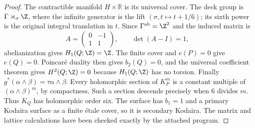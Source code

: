 \begin{proof}
The contractible manifold $H\times\mathbb R$ is its universal cover.
The deck group is $\Gamma\rtimes_\sigma\Z$, where the infinite
generator is the lift $(\sigma,t\mapsto t+1/6)$; its sixth power is
the original integral translation in $t$. Since
$\Gamma^{\rm ab}=\Z^2$ and the induced matrix is
\[
A=\begin{pmatrix}0&-1\\1&1\end{pmatrix},\qquad
\det(A-I)=1,
\]
abelianization gives $H_1(Q;\Z)=\Z$.
The finite cover and $e(P)=0$ give $e(Q)=0$. Poincar\'e duality then
gives $b_2(Q)=0$, and the universal coefficient theorem gives
$H^2(Q;\Z)=0$ because $H_1(Q;\Z)$ has no torsion.
Finally $g^*(\alpha\wedge\beta)=\tau\alpha\wedge\beta$.
Every holomorphic section of $K_P^m$ is a constant multiple of
$(\alpha\wedge\beta)^m$, by compactness. Such a section descends
precisely when $6$ divides $m$. Thus $K_Q$ has holomorphic order six.
The surface has $b_1=1$ and a primary Kodaira surface as a finite
\'etale cover, so it is secondary Kodaira. The matrix and lattice
calculations have been checked exactly by the attached program.
\end{proof}

